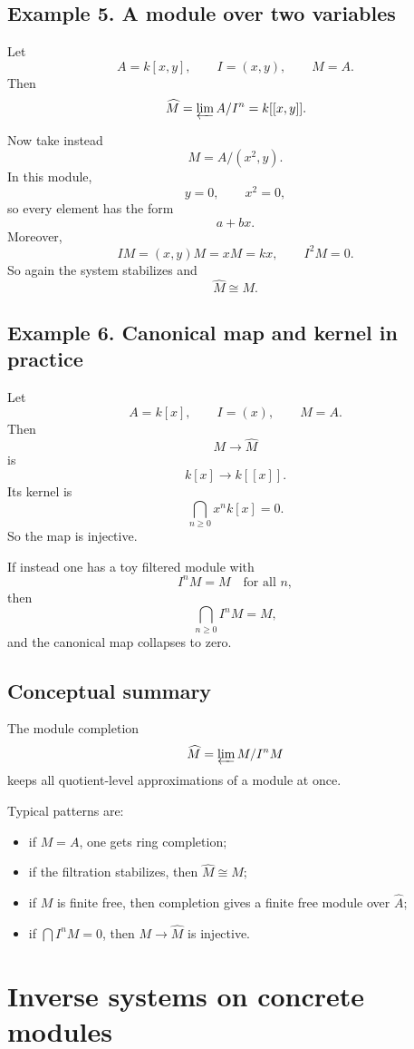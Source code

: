 \documentclass[12pt,a4paper]{article}
\theoremstyle{plain}
\theoremstyle{definition}      %
\begin{document}
	\subsection*{Example 5. A module over two variables}
	
	Let
	\[
	A=k[x,y],\qquad I=(x,y),\qquad M=A.
	\]
	Then
	\[
	\widehat M=\varprojlim A/I^n = k[[x,y]].
	\]
	
	Now take instead
	\[
	M=A/(x^2,y).
	\]
	In this module,
	\[
	y=0,\qquad x^2=0,
	\]
	so every element has the form
	\[
	a+bx.
	\]
	Moreover,
	\[
	IM=(x,y)M=xM=kx,
	\qquad
	I^2M=0.
	\]
	So again the system stabilizes and
	\[
	\widehat M\cong M.
	\]
	
	\subsection*{Example 6. Canonical map and kernel in practice}
	
	Let
	\[
	A=k[x],\qquad I=(x),\qquad M=A.
	\]
	Then
	\[
	M\to \widehat M
	\]
	is
	\[
	k[x]\to k[[x]].
	\]
	Its kernel is
	\[
	\bigcap_{n\ge 0} x^n k[x]=0.
	\]
	So the map is injective.
	
	If instead one has a toy filtered module with
	\[
	I^nM=M \quad\text{for all }n,
	\]
	then
	\[
	\bigcap_{n\ge0} I^nM=M,
	\]
	and the canonical map collapses to zero.
	
	\subsection*{Conceptual summary}
	
	The module completion
	\[
	\widehat M=\varprojlim M/I^nM
	\]
	keeps all quotient-level approximations of a module at once.
	
	Typical patterns are:
	\begin{itemize}
		\item if \(M=A\), one gets ring completion;
		\item if the filtration stabilizes, then \(\widehat M\cong M\);
		\item if \(M\) is finite free, then completion gives a finite free module over \(\widehat A\);
		\item if \(\bigcap I^nM=0\), then \(M\to \widehat M\) is injective.
	\end{itemize}
	
	
	
	\section*{Inverse systems on concrete modules}
	
\end{document}

